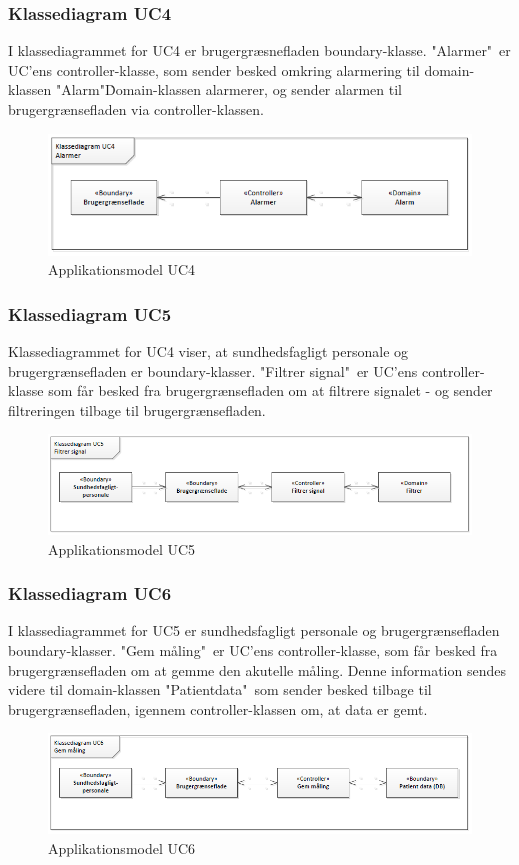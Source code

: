 \subsubsection{Klassediagram UC4}
I klassediagrammet for UC4 er brugergræsnefladen boundary-klasse. "Alarmer"\ er UC'ens controller-klasse, som sender besked omkring alarmering til domain-klassen "Alarm"\. Domain-klassen alarmerer, og sender alarmen til brugergrænsefladen via controller-klassen.
\begin{figure}[H]
\centering
\includegraphics[scale=0.70]{app4.PNG}
\caption{Applikationsmodel UC4}
\end{figure}

\subsubsection{Klassediagram UC5}
Klassediagrammet for UC4 viser, at sundhedsfagligt personale og brugergrænsefladen er boundary-klasser. "Filtrer signal"\ er UC'ens controller-klasse som får besked fra brugergrænsefladen om at filtrere signalet - og sender filtreringen tilbage til brugergrænsefladen.  
\begin{figure}[H]
\centering
\includegraphics[scale=0.70]{app5.PNG}
\caption{Applikationsmodel UC5}
\end{figure}

\subsubsection{Klassediagram UC6}
I klassediagrammet for UC5 er sundhedsfagligt personale og brugergrænsefladen boundary-klasser. "Gem måling"\ er UC'ens controller-klasse, som får besked fra brugergrænsefladen om at gemme den akutelle måling. Denne information sendes videre til domain-klassen "Patientdata"\, som sender besked tilbage til brugergrænsefladen, igennem controller-klassen om, at data er gemt.
\begin{figure}[H]
\centering
\includegraphics[scale=0.70]{app6.PNG}
\caption{Applikationsmodel UC6}
\end{figure}


